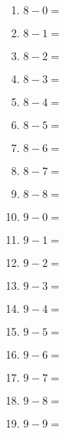\documentclass{article}
\begin{document}
\begin{multicols}{4}
\begin{enumerate}
\item $8 - 0 =$
\item $8 - 1 =$
\item $8 - 2 =$
\item $8 - 3 =$
\item $8 - 4 =$
\item $8 - 5 =$
\item $8 - 6 =$
\item $8 - 7 =$
\item $8 - 8 =$

\item $9 - 0 =$
\item $9 - 1 =$
\item $9 - 2 =$
\item $9 - 3 =$
\item $9 - 4 =$
\item $9 - 5 =$
\item $9 - 6 =$
\item $9 - 7 =$
\item $9 - 8 =$
\item $9 - 9 =$

\end{enumerate}
\end{multicols}
\end{document}
